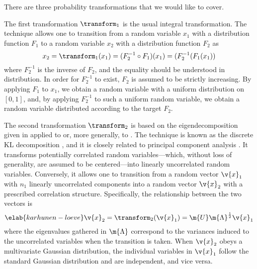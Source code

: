 There are three probability transformations that we would like to cover.

The first transformation $\transform_1$ is the usual integral transformation.
The technique allows one to transition from a random variable $x_1$ with a
distribution function $F_1$ to a random variable $x_2$ with a distribution
function $F_2$ as
\[
  x_2 = \transform_1(x_1) = (F_2^{-1} \circ F_1)(x_1) = (F_2^{-1}(F_1(x_1))
\]
where $F_2^{-1}$ is the inverse of $F_2$, and the equality should be understood
in distribution. In order for $F_2^{-1}$ to exist, $F_2$ is assumed to be
strictly increasing. By applying $F_1$ to $x_1$, we obtain a random variable
with a uniform distribution on $[0, 1]$, and, by applying $F_2^{-1}$ to such a
uniform random variable, we obtain a random variable distributed according to
the target $F_2$.

The second transformation $\transform_2$ is based on the eigendecomposition
given in  applied to  or, more
generally, to . The technique is known as the discrete
\acf{KL} decomposition \cite{ghanem1991, xiu2010}, and it is closely related to
principal component analysis \cite{hastie2013}. It transforms potentially
correlated random variables---which, without loss of generality, are assumed to
be centered---into linearly uncorrelated random variables. Conversely, it allows
one to transition from a random vector $\v{x}_1$ with $n_1$ linearly
uncorrelated components into a random vector $\v{x}_2$ with a prescribed
correlation structure. Specifically, the relationship between the two vectors is
\begin{equation} \elab{karhunen-loeve}
  \v{x}_2 = \transform_2(\v{x}_1) = \m{U} \m{\Lambda}^\frac{1}{2} \v{x}_1
\end{equation}
where the eigenvalues gathered in $\m{\Lambda}$ correspond to the variances
induced to the uncorrelated variables when the transition is taken. When
$\v{x}_2$ obeys a multivariate Gaussian distribution, the individual variables
in $\v{x}_1$ follow the standard Gaussian distribution and are independent, and
vice versa.


